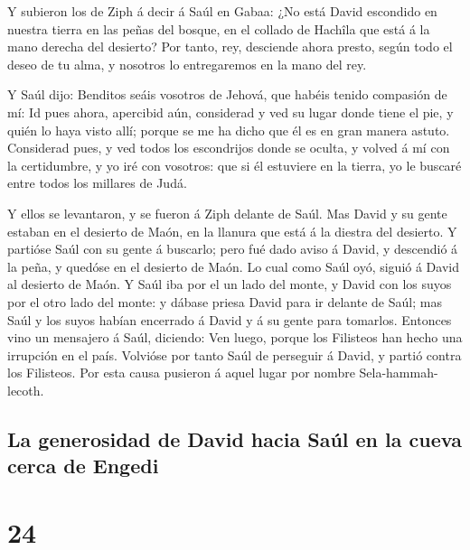  Y subieron los de Ziph á decir á Saúl en Gabaa: ¿No está
David escondido en nuestra tierra en las peñas del bosque, en el collado
de Hachîla que está á la mano derecha del desierto?  Por
tanto, rey, desciende ahora presto, según todo el deseo de tu alma, y
nosotros lo entregaremos en la mano del rey.

 Y Saúl dijo: Benditos seáis vosotros de Jehová, que
habéis tenido compasión de mí:  Id pues ahora, apercibid
aún, considerad y ved su lugar donde tiene el pie, y quién lo haya visto
allí; porque se me ha dicho que él es en gran manera astuto.
 Considerad pues, y ved todos los escondrijos donde se
oculta, y volved á mí con la certidumbre, y yo iré con vosotros: que si
él estuviere en la tierra, yo le buscaré entre todos los millares de
Judá.

 Y ellos se levantaron, y se fueron á Ziph delante de
Saúl. Mas David y su gente estaban en el desierto de Maón, en la llanura
que está á la diestra del desierto.  Y partióse Saúl con
su gente á buscarlo; pero fué dado aviso á David, y descendió á la peña,
y quedóse en el desierto de Maón. Lo cual como Saúl oyó, siguió á David
al desierto de Maón.  Y Saúl iba por el un lado del
monte, y David con los suyos por el otro lado del monte: y dábase priesa
David para ir delante de Saúl; mas Saúl y los suyos habían encerrado á
David y á su gente para tomarlos.  Entonces vino un
mensajero á Saúl, diciendo: Ven luego, porque los Filisteos han hecho
una irrupción en el país.  Volvióse por tanto Saúl de
perseguir á David, y partió contra los Filisteos. Por esta causa
pusieron á aquel lugar por nombre Sela-hammah-lecoth.

\hypertarget{la-generosidad-de-david-hacia-sauxfal-en-la-cueva-cerca-de-engedi}{%
\subsection{La generosidad de David hacia Saúl en la cueva cerca de
Engedi}\label{la-generosidad-de-david-hacia-sauxfal-en-la-cueva-cerca-de-engedi}}

\hypertarget{section-23}{%
\section{24}\label{section-23}}

